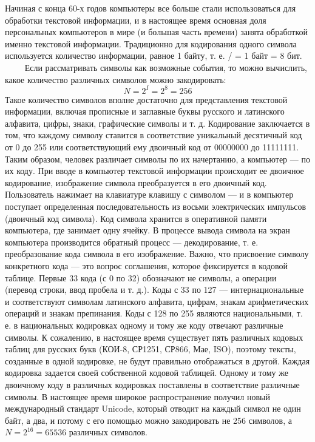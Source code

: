 \documentclass[a4paper]{article}
\begin{document}
Начиная с конца 60-х годов компьютеры все больше стали использоваться для обработки текстовой информации, и в настоящее время основная доля персональных компьютеров в мире (и большая часть времени) занята обработкой именно текстовой информации. Традиционно для кодирования одного символа используется количество информации, равное 1 байту, т. е. / = 1 байт = 8 бит.
    
Если рассматривать символы как возможные события, то можно вычислить, какое количество различных символов можно закодировать:
\[N = 2^{I} = 2^{8} = 256 \]
Такое количество символов вполне достаточно для представления текстовой информации, включая прописные и заглавные буквы русского и латинского алфавита, цифры, знаки, графические символы и т. д. Кодирование заключается в том, что каждому символу ставится в соответствие уникальный десятичный код от 0 до 255 или соответствующий ему двоичный код от 00000000 до 11111111. Таким образом, человек различает символы по их начертанию, а компьютер — по их коду. При вводе в компьютер текстовой информации происходит ее двоичное кодирование, изображение символа преобразуется в его двоичный код. Пользователь нажимает на клавиатуре клавишу с символом — и в компьютер поступает определенная последовательность из восьми электрических импульсов (двоичный код символа). Код символа хранится в оперативной памяти компьютера, где занимает одну ячейку. В процессе вывода символа на экран компьютера производится обратный процесс — декодирование, т. е. преобразование кода символа в его изображение. Важно, что присвоение символу конкретного кода — это вопрос соглашения, которое фиксируется в кодовой таблице. Первые 33 кода (с 0 по 32) обозначают не символы, а операции (перевод строки, ввод пробела и т. д.). Коды с 33 по 127 — интернациональные и соответствуют символам латинского алфавита, цифрам, знакам арифметических операций и знакам препинания. Коды с 128 по 255 являются национальными, т. е. в национальных кодировках одному и тому же коду отвечают различные символы. К сожалению, в настоящее время существует пять различных кодовых таблиц для русских букв (КОИ-8, СР1251, СР866, Мае, ISO), поэтому тексты, созданные в одной кодировке, не будут правильно отображаться в другой.
Каждая кодировка задается своей собственной кодовой таблицей. Одному и тому же двоичному коду в различных кодировках поставлены в соответствие различные символы. В настоящее время широкое распространение получил новый международный стандарт Unicode, который отводит на каждый символ не один байт, а два, и потому с его помощью можно закодировать не 256 символов, а  $N = 2^{16} = 65536$ различных символов.
\end{document}
